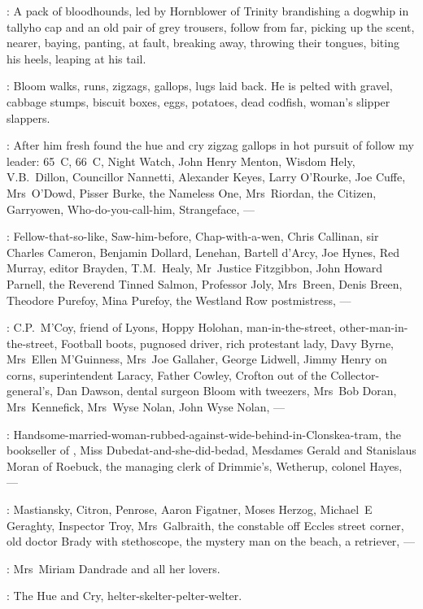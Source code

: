 :
A pack of bloodhounds, led by Hornblower of Trinity
brandishing a dogwhip in tallyho cap and an old pair of grey trousers,
follow from far, picking up the scent, nearer,
baying, panting, at fault, breaking away, throwing their tongues,
biting his heels, leaping at his tail.

:
Bloom walks, runs, zigzags, gallops, lugs laid back.
He is pelted with gravel, cabbage stumps, biscuit boxes, eggs,
potatoes, dead codfish, woman's slipper slappers.

:
After him fresh found the hue and cry
zigzag gallops in hot pursuit of follow my leader:
65~C, 66~C, Night Watch, John Henry Menton, Wisdom Hely,
V.B.~Dillon, Councillor Nannetti, Alexander Keyes,
Larry O'Rourke, Joe Cuffe, Mrs~O'Dowd, Pisser Burke,
the Nameless One, Mrs~Riordan, the Citizen, Garryowen,
Who-do-you-call-him, Strangeface, ---

:
Fellow-that-so-like, Saw-him-before, Chap-with-a-wen,
Chris Callinan, sir Charles Cameron, Benjamin Dollard,
Lenehan, Bartell d'Arcy, Joe Hynes, Red Murray, editor Brayden,
T.M.~Healy, Mr~Justice Fitzgibbon, John Howard Parnell,
the Reverend Tinned Salmon, Professor Joly, Mrs~Breen, Denis Breen,
Theodore Purefoy, Mina Purefoy, the Westland Row postmistress, ---

:
C.P.~M'Coy, friend of Lyons, Hoppy Holohan,
man-in-the-street, other-man-in-the-street, Football boots,
pugnosed driver, rich protestant lady,
Davy Byrne, Mrs~Ellen M'Guinness,
Mrs~Joe Gallaher, George Lidwell, Jimmy Henry on corns,
superintendent Laracy, Father Cowley,
Crofton out of the Collector-general's,
Dan Dawson, dental surgeon Bloom with tweezers, Mrs~Bob Doran, Mrs~Kennefick,
Mrs~Wyse Nolan, John Wyse Nolan, ---

:
Handsome-married-woman-rubbed-against-wide-behind-in-Clonskea-tram,
the book\-seller of , Miss Dubedat-and-she-did-bedad,
Mesdames Gerald and Stanislaus Moran of Roebuck,
the managing clerk of Drimmie's, Wetherup, colonel Hayes, ---

:
Mastiansky, Citron, Penrose, Aaron Figatner, Moses Herzog,
Michael~E Geraghty, Inspector Troy, Mrs~Galbraith,
the constable off Eccles street corner, old doctor Brady with stethoscope,
the mystery man on the beach, a retriever, ---

:
Mrs~Miriam Dandrade and all her lovers.

:
The Hue and Cry, helter-skelter-pelter-welter.

